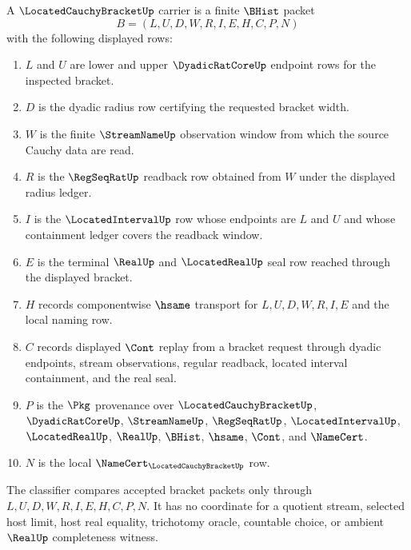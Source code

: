 \begin{definition}
\label{def:located-cauchy-bracket-carrier}
A $\LocatedCauchyBracketUp$ carrier is a finite $\BHist$ packet
$$
B=(L,U,D,W,R,I,E,H,C,P,N)
$$
with the following displayed rows:
\begin{enumerate}
\item $L$ and $U$ are lower and upper $\DyadicRatCoreUp$ endpoint rows for the inspected bracket.
\item $D$ is the dyadic radius row certifying the requested bracket width.
\item $W$ is the finite $\StreamNameUp$ observation window from which the source Cauchy data are read.
\item $R$ is the $\RegSeqRatUp$ readback row obtained from $W$ under the displayed radius ledger.
\item $I$ is the $\LocatedIntervalUp$ row whose endpoints are $L$ and $U$ and whose containment ledger covers the readback window.
\item $E$ is the terminal $\RealUp$ and $\LocatedRealUp$ seal row reached through the displayed bracket.
\item $H$ records componentwise $\hsame$ transport for $L,U,D,W,R,I,E$ and the local naming row.
\item $C$ records displayed $\Cont$ replay from a bracket request through dyadic endpoints, stream observations, regular readback, located interval containment, and the real seal.
\item $P$ is the $\Pkg$ provenance over $\LocatedCauchyBracketUp$, $\DyadicRatCoreUp$, $\StreamNameUp$, $\RegSeqRatUp$, $\LocatedIntervalUp$, $\LocatedRealUp$, $\RealUp$, $\BHist$, $\hsame$, $\Cont$, and $\NameCert$.
\item $N$ is the local $\NameCert_{\LocatedCauchyBracketUp}$ row.
\end{enumerate}
The classifier compares accepted bracket packets only through $L,U,D,W,R,I,E,H,C,P,N$. It has no coordinate for a quotient stream, selected host limit, host real equality, trichotomy oracle, countable choice, or ambient $\RealUp$ completeness witness.
\end{definition}

